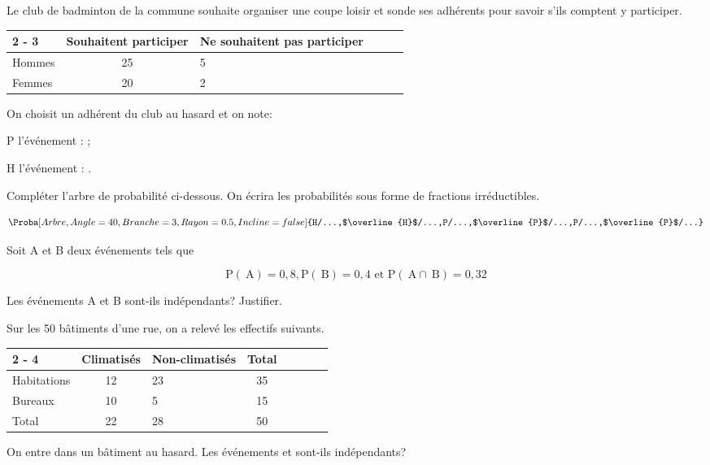 \documentclass[11pt,a4paper]{book}
\begin{document}

Le club de badminton de la commune souhaite organiser une coupe loisir et sonde ses adhérents pour savoir s'ils comptent y participer.

\begin{tabular}{|Xc|Xc|Xc|}
	\cline { 2 - 3 } \multicolumn{1}{c|}{} & Souhaitent participer & Ne souhaitent pas participer \\
	\hline Hommes & 25 & 5 \\
	\hline Femmes & 20 & 2 \\
	\hline
\end{tabular}


On choisit un adhérent du club au hasard et on note:
\begin{itemMet}
	\item P l'événement : ;
	\item H l'événement : . 
\end{itemMet} 
Compléter l'arbre de probabilité ci-dessous.
On écrira les probabilités sous forme de fractions irréductibles.

\[\Proba[Arbre,Angle=40,Branche=3,Rayon=0.5,Incline=false]{H/...,$\overline{H}$/...,P/...,$\overline{P}$/...,P/...,$\overline{P}$/...}\]


Soit A et B deux événements tels que

$$
\mathrm{P}(\mathrm{~A})=0,8, \mathrm{P}(\mathrm{~B})=0,4 \text { et } \mathrm{P}(\mathrm{~A} \cap \mathrm{~B})=0,32
$$


Les événements A et B sont-ils indépendants? Justifier.




Sur les 50 bâtiments d'une rue, on a relevé les effectifs suivants.

\begin{tabular}{|Xc|Xc|Xc|Xc|}
	\cline { 2 - 4 } \multicolumn{1}{c|}{} & Climatisés & Non-climatisés & Total \\
	\hline Habitations & 12 & 23 & 35 \\
	\hline Bureaux & 10 & 5 & 15 \\
	\hline Total & 22 & 28 & 50 \\
	\hline
\end{tabular}

On entre dans un bâtiment au hasard. Les événements  et  sont-ils indépendants?
\end{document}
